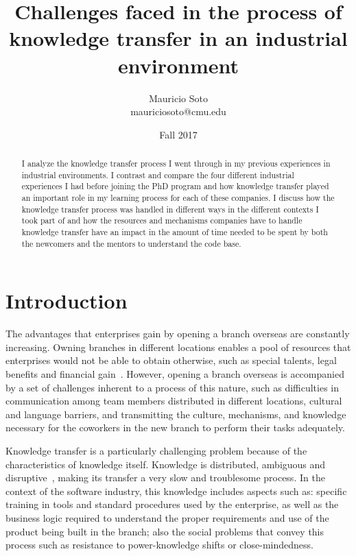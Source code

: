 \documentclass[12pt, letterpaper]{article}
\title{Challenges faced in the process of knowledge transfer in an industrial environment}
\author{Mauricio Soto\\
mauriciosoto@cmu.edu
}
\date{Fall 2017}
\begin{document}
 
\begin{titlepage}
\maketitle


\begin{abstract}
I analyze the knowledge transfer process I went through in my previous experiences in industrial environments.
I contrast and compare the four different industrial experiences I had before joining the PhD program and 
how knowledge transfer played an important role in my learning process for each of these companies.
I discuss how the knowledge transfer process was handled in different ways in the different contexts I took part
of and how the resources and mechanisms companies have to handle knowledge transfer have an impact in the 
amount of time needed to be spent by both the newcomers and the mentors to understand the code base. 
\end{abstract}
\end{titlepage}
 
\section{Introduction}

The advantages that enterprises gain by opening a branch overseas are constantly increasing.
Owning branches in different locations enables a pool of resources that enterprises would not be able
to obtain otherwise, such as special talents, legal benefits and financial gain~\cite{ceruttia07}. However, 
opening a branch overseas is accompanied by a set of challenges inherent to a process of this nature, such as 
difficulties in communication among team members distributed in different locations, 
cultural and language barriers, and transmitting the culture, mechanisms, and knowledge necessary for the 
coworkers in the new branch to perform their tasks adequately. 

Knowledge transfer is a particularly challenging problem because of the characteristics of
knowledge itself. Knowledge is distributed, ambiguous and 
disruptive~\cite{Newell06}, making its transfer a very
slow and troublesome process. 
In the context of the software industry, this knowledge includes aspects such as: specific training in tools and standard procedures used by the enterprise, as well as the
business logic required to understand the proper requirements and use of the product being built
in the branch; also the social problems that convey this process such as resistance to power-knowledge
shifts or close-mindedness.
\end{document}
